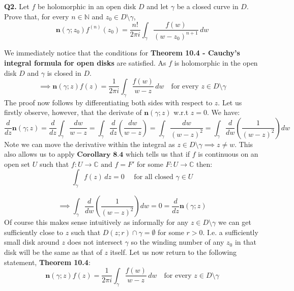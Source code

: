 \documentclass[12pt]{article}
\begin{document}
\[\]
\noindent \textbf{Q2.} Let \(f\) be holomorphic in an open disk \(D\) and let \(\gamma\) be a closed curve in \(D\). Prove that, for every \(n \in \mathbb{N}\) and \(z_0 \in  D \setminus \gamma \),
\[
\mathbf{n}\left(\gamma;z_0\right)f^{\left(n\right)}\left(z_0\right) = \frac{n!}{2\pi i} \int_{\gamma} \frac{f\left(w\right)}{\left(w-z_0\right)^{n+1}} \, dw
\]
\[\]

\noindent We immediately notice that the conditions for {\bfseries Theorem 10.4 - Cauchy's integral formula for open disks }are satisfied. As \(f\) is holomorphic in the open disk \(D\) and \(\gamma\) is closed in \(D\).
\[\implies \mathbf{n}(\gamma; z) f(z) = \frac{1}{2\pi i} \int_\gamma  \frac{f(w)}{w - z} \, dw \quad \text{for every } z \in D \setminus \gamma
\]
\noindent The proof now follows by differentiating both sides with respect to \(z\).\newline
\linebreak
Let us firstly observe, however, that the derivate of \(\mathbf{n}(\gamma; z)\) w.r.t \(z = 0\).\newline
\linebreak
We have:
\[
\frac{d}{dz} \mathbf{n}(\gamma; z) = \frac{d}{dz} \int_{\gamma} \frac{dw}{w-z} = \int_{\gamma}\frac{d}{dz} \left( \frac{dw}{w-z} \right) =  \int_{\gamma} \frac{dw}{\left(w-z\right)^2}=  \int_{\gamma} \frac{d}{dw}\left(\frac{1}{\left(w-z\right)^2}\right)dw
\]
Note we can move the derivative within the integral as  \(z \in D \setminus \gamma \implies z \neq w\). This also allows us to apply \(\textbf{Corollary 8.4}\) which tells us that if \(f\) is continuous on an open set \(U\) such that \(f:U\rightarrow \mathbb{C} \text{ and } f = F'\) for some \(F:U\rightarrow \mathbb{C}\) then:
\[
\int_{\gamma} f(z) \, dz = 0 \quad \text{ for all closed }\gamma \in U
\]


\[
    \implies \int_{\gamma} \frac{d}{dw}\left(\frac{1}{\left(w-z\right)^2}\right)dw = 0 = \frac{d}{dz} \mathbf{n}(\gamma; z)
\]
\[\]
\noindent Of course this makes sense intuitively as informally for any \(z \in D \setminus \gamma\) we can get sufficiently close to \(z\) such that \(D(z;r)\cap \gamma = \emptyset\) for some \(r>0\). I.e. a sufficiently small disk around \(z\) does not intersect \(\gamma\) so the winding number of any \(z_0\) in that disk will be the same as that of \(z\) itself. \newline
\linebreak
\noindent Let us now return to the following statement, {\bfseries Theorem 10.4}:
\[
    \mathbf{n}(\gamma; z) f(z) = \frac{1}{2\pi i} \int_\gamma  \frac{f(w)}{w - z} \, dw \quad \text{for every } z \in D \setminus \gamma
\]
\end{document}
